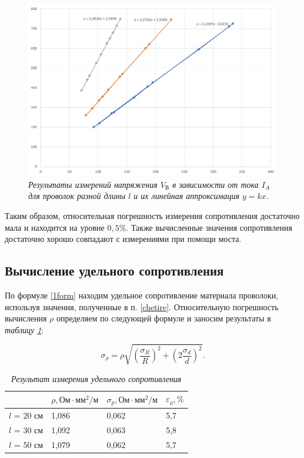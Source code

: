 \documentclass[a4paper,12pt]{article} %
\begin{document}
\begin{figure}[h!]
	\includegraphics[width=1\linewidth]{gr.jpg}
	\caption{\textit{Результаты измерений напряжения $ V_\text{В} $ в зависимости от тока $ I_A $ для проволок разной длины $ l $ и их линейная аппроксимация $ y=kx $.}}
	\label{graph}
\end{figure}
	
	
Таким образом, относительная погрешность измерения сопротивления достаточно мала и находится на уровне $ 0,5\% $. Также вычисленные значения сопротивления достаточно хорошо совпадают с измерениями при помощи моста.	

\subsection{Вычисление удельного сопротивления}

По формуле \eqref{1form} находим удельное сопротивление материала проволоки, используя значения, полученные в п. \ref{chetire}. Относительную погрешность вычисления $ \rho $ определяем по следующей формуле и заносим результаты в \textit{таблицу \ref{rezi}}:

\begin{equation}
\sigma_\rho = \rho \sqrt{\left( \frac{\sigma_R}{R}  \right)^2 + \left( 2 \frac{\sigma_d}{d} \right) ^2 }.
\end{equation}

\begin{table}[h]

	\begin{tabular}{|l|l|l|l|}
		\hline
		& $ \rho , \text{Ом} \cdot \text{мм}^2 / \text{м} $   & $ \sigma_p, \text{Ом} \cdot \text{мм}^2 / \text{м} $ & $ \varepsilon_\rho, \% $   \\ \hline
		$l$ = 20 см & 1,086 & 0,062 & 5,7 \\ \hline
		$l$ = 30 см & 1,092 & 0,063 & 5,8 \\ \hline
		$l$ = 50 см & 1,079 & 0,062 & 5,7 \\ \hline
	\end{tabular}
	\caption{\textit{Результат измерения удельного сопротивления}}\label{rezi}
\end{table}
\end{document}
